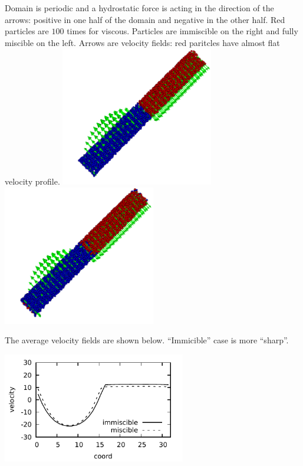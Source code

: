Domain is periodic and a hydrostatic force is acting in the direction of the arrows:
positive in one half of the domain and negative in the other half.  Red
particles are $100$ times for viscous. Particles are immiscible on the
right and fully miscible on the left. Arrows are velocity fields: red
paritcles have almost flat velocity profile.
\includegraphics[width=0.5\textwidth]{i/flow/a/visit.png}
\includegraphics[width=0.5\textwidth]{i/flow/b/visit.png}


The average velocity fields are shown below. ``Immicible'' case is
more ``sharp''.

\begin{center}
\includegraphics[width=0.6\textwidth]{i/flow/prof.pdf}
\end{center}
